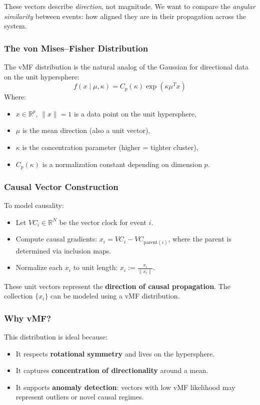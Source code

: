 These vectors describe \emph{direction}, not magnitude. We want to compare the \emph{angular similarity} between events: how aligned they are in their propagation across the system.

\subsubsection{The von Mises--Fisher Distribution}
The vMF distribution is the natural analog of the Gaussian for directional data on the unit hypersphere:
\[
  f(x \mid \mu, \kappa) = C_p(\kappa) \exp(\kappa \mu^T x)
\]
Where:
\begin{itemize}
  \item $x \in \mathbb{R}^p$, $\|x\| = 1$ is a data point on the unit hypersphere,
  \item $\mu$ is the mean direction (also a unit vector),
  \item $\kappa$ is the concentration parameter (higher = tighter cluster),
  \item $C_p(\kappa)$ is a normalization constant depending on dimension $p$.
\end{itemize}

\subsubsection{Causal Vector Construction}
To model causality:
\begin{itemize}
  \item Let $VC_i \in \mathbb{R}^N$ be the vector clock for event $i$.
  \item Compute causal gradients: $x_i = VC_i - VC_{\text{parent}(i)}$, where the parent is determined via inclusion maps.
  \item Normalize each $x_i$ to unit length: $x_i := \frac{x_i}{\|x_i\|}$.
\end{itemize}

These unit vectors represent the \textbf{direction of causal propagation}. The collection $\{x_i\}$ can be modeled using a vMF distribution.

\subsubsection{Why vMF?}
This distribution is ideal because:
\begin{itemize}
  \item It respects \textbf{rotational symmetry} and lives on the hypersphere.
  \item It captures \textbf{concentration of directionality} around a mean.
  \item It supports \textbf{anomaly detection}: vectors with low vMF likelihood may represent outliers or novel causal regimes.
\end{itemize}

